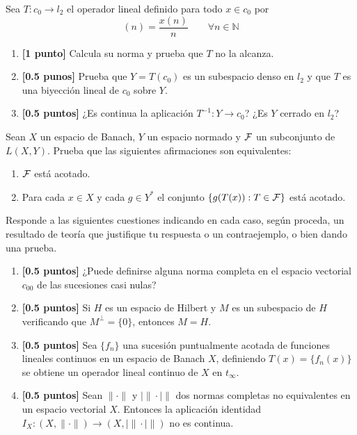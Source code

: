 \documentclass[12pt]{article}
\begin{document}
    \begin{ejercicio}[2 puntos]
        Sea $T:c_0\to l_2$ el operador lineal definido para todo $x\in c_0$ por
        \begin{equation*}
            [Tx](n) = \frac{x(n)}{n}\qquad \forall n\in \mathbb{N}
        \end{equation*}
        \begin{enumerate}[label=\alph*)]
            \item \textbf{[1 punto]} Calcula su norma y prueba que $T$ no la alcanza.
            \item \textbf{[0.5 punos]} Prueba que $Y=T(c_0)$ es un subespacio denso en $l_2$ y que $T$ es una biyección lineal de $c_0$ sobre $Y$.
            \item \textbf{[0.5 puntos]} ¿Es continua la aplicación $T^{-1}:Y\to c_0$? ¿Es $Y$ cerrado en $l_2$?
        \end{enumerate}
    \end{ejercicio}

    \begin{ejercicio}[1.5 puntos]
        Sean $X$ un espacio de Banach, $Y$ un espacio normado y $\mathcal{F}$ un subconjunto de $L(X,Y)$. Prueba que las siguientes afirmaciones son equivalentes:
        \begin{enumerate}[label=\alph*)]
            \item $\mathcal{F}$ está acotado.
            \item Para cada $x\in X$ y cada $g\in Y^\ast$ el conjunto $\{g(T(x)) : T\in \mathcal{F}\}$ está acotado.
        \end{enumerate}
    \end{ejercicio}

    \begin{ejercicio}[2 puntos]
        Responde a las siguientes cuestiones indicando en cada caso, según proceda, un resultado de teoría que justifique tu respuesta o un contraejemplo, o bien dando una prueba.
        \begin{enumerate}[label=\alph*)]
            \item \textbf{[0.5 puntos]} ¿Puede definirse alguna norma completa en el espacio vectorial $c_{00}$ de las sucesiones casi nulas?
            \item \textbf{[0.5 puntos]} Si $H$ es un espacio de Hilbert y $M$ es un subespacio de $H$ verificando que $M^\perp = \{0\}$, entonces $M = H$.
            \item \textbf{[0.5 puntos]} Sea $\{f_n\}$ una sucesión puntualmente acotada de funciones lineales continuos en un espacio de Banach $X$, definiendo $T(x) = \{f_n(x)\}$ se obtiene un operador lineal continuo de $X$ en $t_\infty$.
            \item \textbf{[0.5 puntos]} Sean $\|\cdot \|$ y $|\|\cdot |\|$ dos normas completas no equivalentes en un espacio vectorial $X$. Entonces la aplicación identidad $I_X:(X,\|\cdot \|)\to (X,|\|\cdot |\|)$ no es continua.
        \end{enumerate}
    \end{ejercicio}
\end{document}
